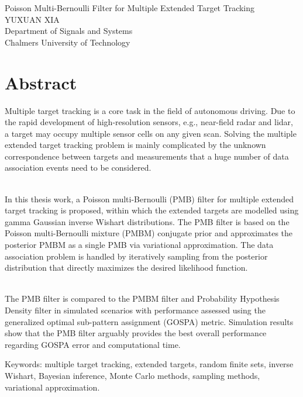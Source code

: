Poisson Multi-Bernoulli Filter for Multiple Extended Target Tracking\\
YUXUAN XIA\\
Department of Signals and Systems\\
Chalmers University of Technology
\setlength{\parskip}{0.5cm}

\thispagestyle{plain}			%
\setlength{\parskip}{0pt plus 1.0pt}
\section*{Abstract}
Multiple target tracking is a core task in the field of autonomous driving. Due to the rapid development of high-resolution sensors, e.g., near-field radar and lidar, a target may occupy multiple sensor cells on any given scan. Solving the multiple extended target tracking problem is mainly complicated by the unknown correspondence between targets and measurements that a huge number of data association events need to be considered.

~\\
In this thesis work, a Poisson multi-Bernoulli (PMB) filter for multiple extended target tracking is proposed, within which the extended targets are modelled using gamma Gaussian inverse Wishart  distributions. The PMB filter is based on the Poisson multi-Bernoulli mixture (PMBM) conjugate prior and approximates the posterior PMBM as a single PMB via variational approximation. The data association problem is handled by iteratively sampling from the posterior distribution that directly maximizes the desired likelihood function. 

~\\
The PMB filter is compared to the PMBM filter and Probability Hypothesis Density filter in simulated scenarios with performance assessed using the generalized optimal sub-pattern assignment (GOSPA) metric. Simulation results show that the PMB filter arguably provides the best overall performance regarding GOSPA error and computational time. 



\vfill
Keywords: multiple target tracking, extended targets, random finite sets, inverse Wishart, Bayesian inference, Monte Carlo methods, sampling methods, variational approximation.

\newpage				%
\thispagestyle{empty}
\mbox{}